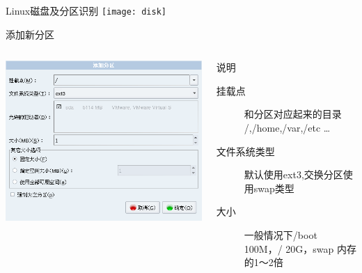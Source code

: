 \begin{frame}{Linux磁盘及分区识别}
\texttt{[image: disk]}
\end{frame}



\begin{frame}[shrink=5]{添加新分区}
	\begin{columns}[t]
		\begin{exampleblock}{}
			\includegraphics[scale=.35]{images/axs3-install/parition-add}%
		\end{exampleblock}
		
		
			\begin{exampleblock}{说明}
			\begin{description}
				\item [挂载点] \small{和分区对应起来的目录 /,/home,/var,/etc \ldots}
				\item [文件系统类型] \small{默认使用ext3,交换分区使用swap类型}
				\item [大小] \small{一般情况下/boot 100M，/ 20G，swap 内存的1～2倍}
			\end{description}
			\end{exampleblock}
		\end{columns}

\end{frame}


